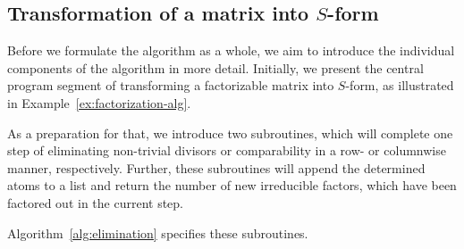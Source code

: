 \subsection{Transformation of a matrix into $S$-form}

Before we formulate the algorithm as a whole, we aim to introduce the individual components of the algorithm in more detail. Initially, we present the central program segment of transforming a factorizable matrix into $S$-form, as illustrated in Example~\ref{ex:factorization-alg}. 

As a preparation for that, we introduce two subroutines, which  will complete one step of eliminating non-trivial divisors or comparability in a row- or columnwise manner, respectively. Further, these subroutines will append the determined atoms to a list and return the number of new irreducible factors, which have been factored out in the current step.

\newpage
Algorithm~\ref{alg:elimination} specifies these subroutines.

